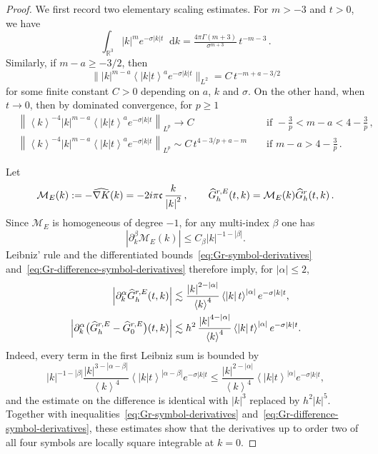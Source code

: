 \documentclass[10pt,a4paper]{amsart}
\newcommand		{\CK}			{\mathfrak{c}}	%
\newcommand		{\Nrm}[2]		{\nrm{#1}_{#2}}
\newcommand		{\R}		{\RR}
\newcommand		{\RR}		{\mathbb R}			%
\newcommand		{\Rd}		{\R^3}
\newcommand		{\bNrm}[2]		{\bnrm{#1}_{#2}}
\newcommand		{\bangle}[1]	{\lt\langle #1\rt\rangle}
\newcommand		{\bnrm}[1]		{\big\lVert #1\big\rVert}
\newcommand	{\cM}		{\mathcal M}		%
\renewcommand		{\d}		{\mathop{}\!\mathrm{d}}		%
\newcommand	{\h}			{h}
\newcommand		{\hatG}			{\widehat{G}}
\newcommand		{\hatGr}		{\hatG^{\textnormal{r}}}
\newcommand		{\hatGrE}		{\hatG^{\textnormal{r},E}}
\newcommand		{\intd}			{\int_{\Rd}}
\newcommand		{\lt}			{\left}				%
\newcommand		{\n}[1]			{\lt\lvert{#1}\rt\rvert}	%
\newcommand		{\nrm}[1]		{\lt\lVert{#1}\rt\rVert}		%
\newcommand		{\rt}			{\right}			%
\newcommand		{\weight}[1]	{\bangle{#1}}	%
\begin{document}
	\begin{proof}
		We first record two elementary scaling estimates. For $m>-3$ and $t>0$, we have
		\begin{equation}\label{eq:radial-L1-scaling}
			\intd \n{k}^m e^{-\sigma \n{k}t} \d k = \tfrac{4\pi \Gamma(m+3)}{\sigma^{m+3}}\, t^{-m-3} \, .
		\end{equation}
		Similarly, if $m-a \geq - 3/2$, then
		\begin{equation}\label{eq:radial-L2-scaling}
			\bNrm{\n{k}^{m-a}\weight{\n{k}t}^{a}e^{-\sigma \n{k} t}}{L^2} = C\, t^{-m+a-3/2}
		\end{equation}
		for some finite constant $C>0$ depending on $a$, $k$ and $\sigma$. On the other hand, when $t\to 0$, then by dominated convergence, for $p\geq 1$
		\begin{align*} %
			&\Nrm{\weight{k}^{-4}\n{k}^{m-a}\weight{\n{k}t}^{a}e^{-\sigma \n{k} t}}{L^p} \to C &&\text{ if } -\frac{3}{p}<m-a<4-\frac{3}{p} \, ,
            \\
            &\Nrm{\weight{k}^{-4}\n{k}^{m-a}\weight{\n{k}t}^{a}e^{-\sigma \n{k} t}}{L^p} \sim C\,t^{4-3/p+a-m} &&\text{ if } m-a>4-\frac{3}{p} \, .
		\end{align*}

		Let
		\begin{equation*}
			\mathcal M_E(k) := -\widehat{\nabla K}(k) = -2i\pi \CK \, \frac{k}{\n{k}^2} \, ,
			\qquad
			\hatGrE_\h(t,k)=\mathcal M_E(k)\hatGr_\h(t,k) \, .
		\end{equation*}
		Since $\mathcal M_E$ is homogeneous of degree $-1$, for any multi-index $\beta$ one has
		\begin{equation*}
			\n{\partial_k^\beta\cM_E(k)} \leq C_\beta \n{k}^{-1-\n{\beta}}  .
		\end{equation*}
		Leibniz' rule and the differentiated bounds~\eqref{eq:Gr-symbol-derivatives} and~\eqref{eq:Gr-difference-symbol-derivatives} therefore imply, for $\n{\alpha}\leq 2$,
		\begin{align}\label{eq:GrE-symbol-derivatives}
			\n{\partial_k^\alpha \hatGrE_\h(t,k)}
			&\lesssim \frac{\n{k}^{2-\n{\alpha}}}{\weight{k}^4}
			\weight{\n{k}t}^{\n{\alpha}}e^{-\sigma \n{k}t},
			\\\label{eq:GrE-difference-symbol-derivatives}
			\n{\partial_k^\alpha
			\bigl(\hatGrE_\h - \hatGrE_0\bigr)(t,k)}
			&\lesssim h^2 \, \frac{\n{k}^{4-\n{\alpha}}}{\weight{k}^4}
			\weight{\n{k}t}^{\n{\alpha}}e^{-\sigma \n{k}t}.
		\end{align}
		Indeed, every term in the first Leibniz sum is bounded by
		\begin{equation*}
			\n{k}^{-1-|\beta|}
			\frac{\n{k}^{3-|\alpha-\beta|}}{\weight{k}^4}
			\weight{\n{k}t}^{|\alpha-\beta|}e^{-\sigma \n{k}t}
			\leq \frac{\n{k}^{2-\n{\alpha}}}{\weight{k}^4}
			\weight{\n{k}t}^{\n{\alpha}}e^{-\sigma \n{k}t},
		\end{equation*}
		and the estimate on the difference is identical with $\n{k}^3$ replaced by $h^2\n{k}^5$. Together with inequalities~\eqref{eq:Gr-symbol-derivatives} and~\eqref{eq:Gr-difference-symbol-derivatives}, these estimates show that the derivatives up to order two of all four symbols are locally square integrable at $k=0$. 


\end{proof}
\end{document}
